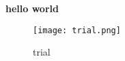 \documentclass[VM.tex]{subfiles}
\begin{document}
\textbf{hello world}


\begin{figure}[h]
\texttt{[image: trial.png]}
\label{fig:trialzez}
\caption{trial}

\end{figure}
\end{document}
